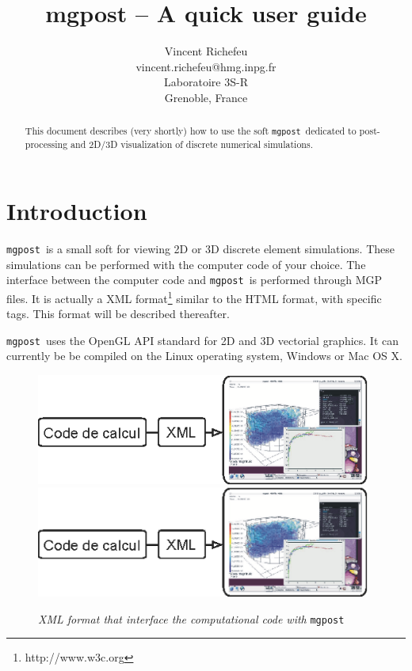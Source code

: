 \documentclass{simpledoc}
\title{mgpost -- A quick user guide}
\author{Vincent Richefeu\\
vincent.richefeu@hmg.inpg.fr\\
Laboratoire 3S-R\\
Grenoble, France\\
}
\newcommand{\mgpost}{\texttt{mgpost}\ }
\begin{document}
\maketitle

\begin{abstract}
This document describes (very shortly) how to use the soft \mgpost dedicated to 
post-processing and 2D/3D visualization of discrete numerical simulations.
\end{abstract}

\tableofcontents

\newpage

\section{Introduction}

\mgpost is a small soft for viewing 
2D or 3D discrete element simulations. These simulations can be 
performed with the computer code of your choice.
The interface between the computer code and \mgpost is performed through MGP files.
It is actually a XML format\footnote{http://www.w3c.org} similar to the HTML format, with 
specific tags. This format will be described thereafter.

\mgpost uses the OpenGL API standard 
for 2D and 3D vectorial graphics. It can currently be 
be compiled on the Linux operating system, Windows or Mac OS X.
%
\begin{figure}[H]
\begin{center}
\ifpdf
\includegraphics[width=11cm]{figs/xml.png}
\else
\includegraphics[width=11cm]{figs/xml.eps}
\fi
\end{center}
\caption{\emph{XML format that interface the computational code with } \mgpost}
\label{fig:xml_interface}
\end{figure}
\end{document}
